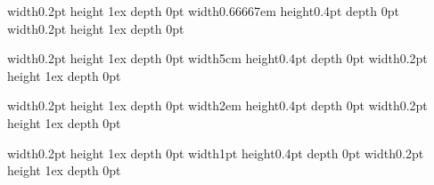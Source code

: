 \documentclass{article}
\newcommand\showdim[1][0.66667em]{%
			\leavevmode\vrule width0.2pt height 1ex depth 0pt
			\vrule width#1 height0.4pt depth 0pt
			\vrule width0.2pt height 1ex depth 0pt%
		}
\begin{document}
\showdim

\showdim[5cm]

\showdim[2em]

\showdim[1pt]
\end{document}
